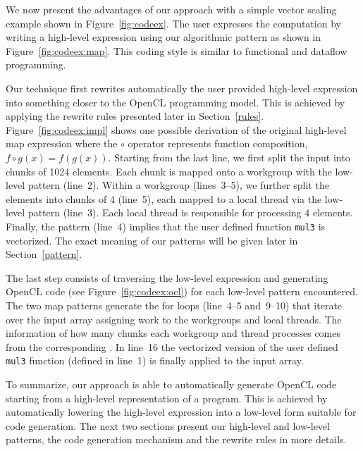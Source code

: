 We now present the advantages of our approach with a simple vector scaling example shown in Figure~\ref{fig:codeex}.
The user expresses the computation by writing a high-level expression using our  algorithmic pattern as shown in Figure~\ref{fig:codeex:map}.
This coding style is similar to functional and dataflow programming.

Our technique first rewrites automatically the user provided high-level expression into something closer to the OpenCL programming model.
This is achieved by applying the rewrite rules presented later in Section~\ref{rules}.
Figure~\ref{fig:codeex:impl} shows one possible derivation of the original high-level map expression where the $\circ$ operator represents function composition, \ie $f \circ g(x) = f(g(x))$.
Starting from the last line, we first split the input into chunks of 1024 elements.
Each chunk is mapped onto a workgroup with the  low-level pattern (line~2).
Within a workgroup (lines~3--5), we further split the elements into chunks of 4 (line~5), each mapped to a local thread via the  low-level pattern (line~3).
Each local thread is responsible for processing 4 elements.
Finally, the  pattern (line~4) implies that the user defined function \texttt{mul3} is vectorized.
The exact meaning of our patterns will be given later in Section~\ref{pattern}.

The last step consists of traversing the low-level expression and generating OpenCL code (see Figure~\ref{fig:codeex:ocl}) for each low-level pattern encountered.
The two map patterns generate the for loops (line~4--5 and~9--10) that iterate over the input array assigning work to the workgroups and local threads.
The information of how many chunks each workgroup and thread processes comes from the corresponding .
In line~16 the vectorized version of the user defined \texttt{mul3} function (defined in line~1) is finally applied to the input array.

To summarize, our approach is able to automatically generate OpenCL code starting from a high-level representation of a program.
This is achieved by automatically lowering the high-level expression into a low-level form suitable for code generation.
The next two sections present our high-level and low-level patterns, the code generation mechanism and the rewrite rules in more details.


